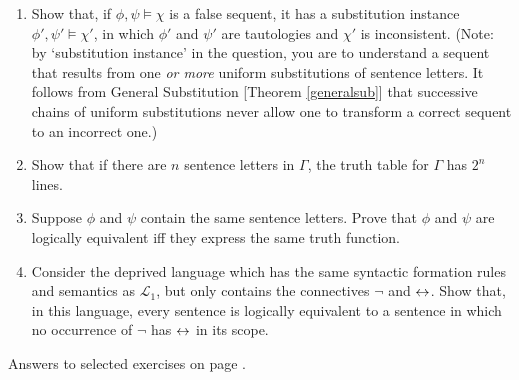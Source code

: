 {\begin{enumerate}
\item Show that, if $\phi,\psi \vDash \chi$ is a false sequent,
it has a substitution instance $\phi',\psi' \vDash \chi'$, in which 
$\phi'$ and $\psi'$ are tautologies and $\chi'$ is
inconsistent. (Note: by `substitution instance' in the question, you are to understand a sequent that results from one \emph{or more} uniform substitutions of sentence letters. It follows from General Substitution [Theorem \ref{generalsub}] that successive chains of uniform substitutions never allow one to transform a correct sequent to an incorrect one.)

\item  Show that if there are $n$ sentence letters in $\Gamma$, the truth table for $\Gamma$ has $2^{n}$ lines.

\item Suppose $\phi$ and $\psi$ contain the same sentence letters. Prove that $\phi$ and $\psi$ are logically equivalent iff they express the same truth function.

\item Consider the deprived language which has the same syntactic formation rules and semantics as $\mathcal{L}_{1}$, but only contains the connectives $\neg$ and $\leftrightarrow$. Show that, in this language, every sentence is logically equivalent to a sentence in which no occurrence of $\neg$ has $\leftrightarrow$ in its scope.
\end{enumerate}

Answers to selected exercises on page \pageref{ans4}.
}
